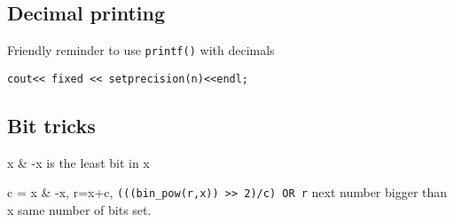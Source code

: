 \documentclass[10pt]{article}
\begin{document}
\begin{multicols*}{2}
\subsection{Decimal printing}

Friendly reminder to use \texttt{printf()} with decimals

\begin{lstlisting}[style=compactcpp]
cout<< fixed << setprecision(n)<<endl;
\end{lstlisting}

\subsection{Bit tricks}

x \& -x is the least bit in x

c = x \& -x, r=x+c, \texttt{(((bin\_pow(r,x)) >> 2)/c) OR r}  next number bigger than x same number of bits set.

\end{multicols*}
\end{document}
